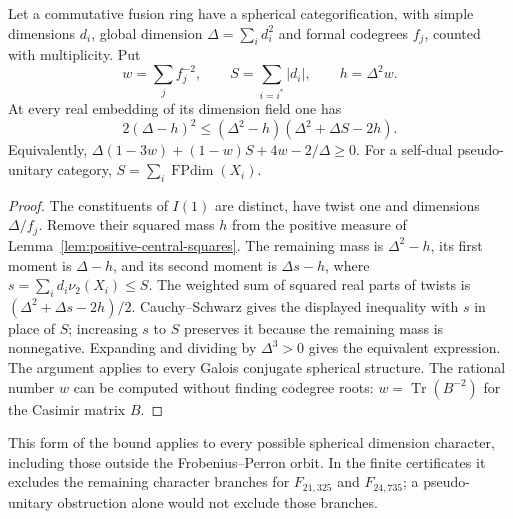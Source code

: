 \begin{proposition}\label{prop:spherical-codegree-moment}
Let a commutative fusion ring have a spherical categorification, with
simple dimensions $d_i$, global dimension $\Delta=\sum_i d_i^2$ and
formal codegrees $f_j$, counted with multiplicity. Put
\[
 w=\sum_j f_j^{-2},\qquad
 S=\sum_{i=i^*}|d_i|,\qquad h=\Delta^2w.
\]
At every real embedding of its dimension field one has
\begin{equation}\label{eq:spherical-codegree-moment}
 2(\Delta-h)^2\leq
 (\Delta^2-h)(\Delta^2+\Delta S-2h).
\end{equation}
Equivalently,
$\Delta(1-3w)+(1-w)S+4w-2/\Delta\geq0$.
For a self-dual pseudo-unitary category,
$S=\sum_i\operatorname{FPdim}(X_i)$.
\end{proposition}
\begin{proof}
The constituents of $I(1)$ are distinct, have twist one and dimensions
$\Delta/f_j$. Remove their squared mass $h$ from the positive measure
of Lemma~\ref{lem:positive-central-squares}. The remaining mass is
$\Delta^2-h$, its first moment is $\Delta-h$, and its second moment is
$\Delta s-h$, where $s=\sum_i d_i\nu_2(X_i)\leq S$.
The weighted sum of squared real parts of twists is
$(\Delta^2+\Delta s-2h)/2$. Cauchy--Schwarz gives the displayed
inequality with $s$ in place of $S$; increasing $s$ to $S$ preserves it
because the remaining mass is nonnegative. Expanding and dividing by
$\Delta^3>0$ gives the equivalent expression.
The argument applies to every Galois conjugate spherical structure.
The rational number $w$ can be computed without finding codegree roots:
$w=\operatorname{Tr}(B^{-2})$ for the Casimir matrix $B$.
\end{proof}

This form of the bound applies to every possible spherical dimension
character, including those outside the Frobenius--Perron orbit. In the
finite certificates it excludes the remaining character branches for
$F_{21,325}$ and $F_{24,735}$; a pseudo-unitary obstruction alone would
not exclude those branches.

